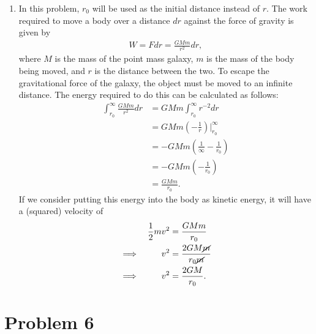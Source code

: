 \documentclass[11pt,letterpaper]{article}
\begin{document}
\begin{enumerate}[label=(\alph*)]
    \item In this problem, $r_0$ will be used as the initial distance instead of $r$. The work required to move a body over a distance $dr$ against the force of gravity is given by 
        \begin{align*}
            W = Fdr = \frac{GMm}{r^2}dr,
        \end{align*}
        where $M$ is the mass of the point mass galaxy, $m$ is the mass of the body being moved, and $r$ is the distance between the two. To escape the gravitational force of the galaxy, the object must be moved to an infinite distance. The energy required to do this can be calculated as follows:
        \begin{align*}
            \int_{r_0}^{\infty} \frac{GMm}{r^2}dr &= GMm \int_{r_0}^{\infty} r^{-2}dr \\
            &= GMm\left(-\frac{1}{r}\right)\Big|_{r_0}^{\infty} \\
            &= -GMm\left(\frac{1}{\infty} - \frac{1}{r_0}\right) \\
            &= -GMm\left(-\frac{1}{r_0}\right) \\
            &= \frac{GMm}{r_0}.
        \end{align*}
        If we consider putting this energy into the body as kinetic energy, it will have a (squared) velocity of 
        \begin{alignat*}{2}
            &&\frac{1}{2}mv^2 &= \frac{GMm}{r_0} \\
            \implies&&v^2 &= \frac{2GM\cancel{m}}{r_0\cancel{m}} \\
            \implies&&v^2 &= \frac{2GM}{r_0}.
        \end{alignat*}
\end{enumerate}

\section*{Problem 6} 

\begin{enumerate}[label=(\alph*)]
\end{enumerate}

\end{document}
